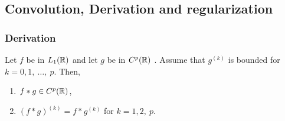 

\subsection{Convolution, Derivation and regularization}

\begin{frame}
\frametitle{Derivation}
\begin{theorem}
Let $f$ be in $L_1(\mathbb{R})$ and let $g$ be in $C^{p}(\mathbb{R})$ .  Assume that $g^{(k)}$ is bounded for $k=0,1,\ \ldots,\ p$. Then,
\begin{enumerate}[label=(\roman*)]
\item $ f*g\in C^{p}(\mathbb{R})$,
\item  $(f*g)^{(k)}=f*g^{(k)}$  for $k=1,2,\ p$.
\end{enumerate}
\end{theorem}
\end{frame}

